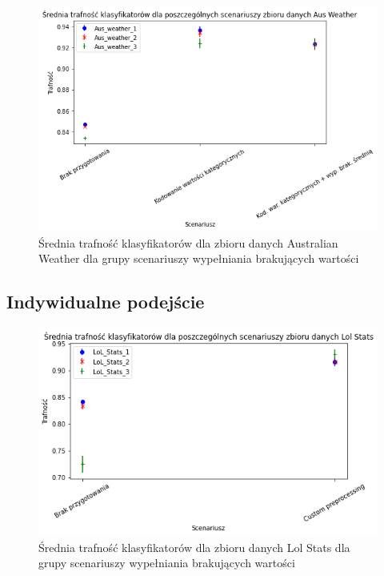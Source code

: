 \documentclass{book}
\begin{document}
\begin{figure}[H]
    \centerline{\includegraphics[scale=0.5]{Aus_Weather_Avg_Kodowanie}}
    \centering
    \caption{Średnia trafność klasyfikatorów dla zbioru danych Australian Weather 
    dla grupy scenariuszy wypełniania brakujących wartości}
    \end{figure}

\subsection{Indywidualne podejście}

\begin{figure}[H]
    \centerline{\includegraphics[scale=0.5]{Lol_Stats_Avg_Custom}}
    \centering
    \caption{Średnia trafność klasyfikatorów dla zbioru danych Lol Stats 
    dla grupy scenariuszy wypełniania brakujących wartości}
    \end{figure}
\end{document}

